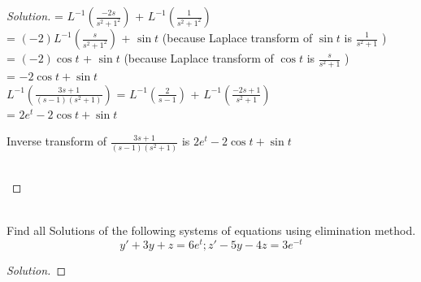 \documentclass[12pt]{article}
\newenvironment{problem}[2][Problem]{\begin{trivlist}
\item[\hskip \labelsep {\bfseries #1}\hskip \labelsep {\bfseries #2.}]}{\end{trivlist}}
\begin{document}
\begin{proof}[Solution]
                             = $L^{-1} (\frac{-2s}{s^2+1^2})$  +  $L^{-1}(\frac{1}{s^2+1^2})$ \\
                             
                             = $(-2)L^{-1}(\frac{s}{s^2+1^2})$  +  $\sin{t}$  (because Laplace transform of $\sin{t}$  is  $ \frac{1}{s^2+1}$ )\\
                             
                             = $(-2) \cos{t}$ +  $\sin{t}$  (because Laplace transform of $\cos{t}$  is  $ \frac{s}{s^2+1}$ )\\              
                             
                             = $ -2 \cos{t} + \sin{t} $ \\
                             
    $L^{-1}(\frac{3s+1}{(s-1)(s^2+1)})$  = $L^{-1}(\frac{2}{s-1})$  +  $L^{-1}(\frac{-2s+1}{s^2+1})$ \\
    
                                    =  $2 e^t - 2\cos{t} + \sin{t} $ \\
                                    
 \begin{Large} Inverse transform of $\frac{3s+1}{(s-1)(s^2+1)}$  is  $2 e^t - 2\cos{t} + \sin{t} $  \end{Large} \\
\end{proof}

\begin{problem}{6}
\text{ }\\
Find all Solutions of the following systems of equations using elimination method.\\
    $$y'+3y+z = 6e^t ; z'-5y-4z = 3e^{-t}$$

\end{problem}
 
\begin{proof}[Solution]

\end{proof}
\end{document}
